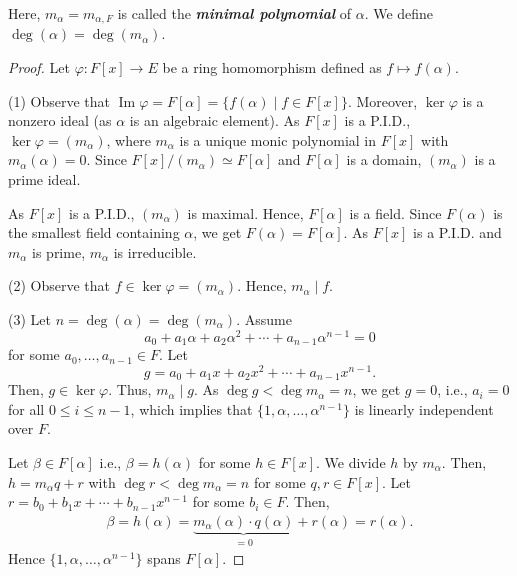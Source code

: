 \documentclass[twoside]{article}
\theoremstyle{remark}
\newcommand*\term[1]{\textbf{\textit{\mathversion{bold}#1}}}
\begin{document}
%
Here, \(m_\alpha = m_{\alpha,F}\) is called the \term{minimal polynomial} of \(\alpha\). We define \(\deg(\alpha) = \deg(m_\alpha)\).

\begin{proof}
  Let \(\varphi\colon F[x] \to E\) be a ring homomorphism defined as \(f \mapsto f(\alpha)\).
  
  \smallskip
  
  (1) Observe that \(\operatorname{Im}\varphi = F[\alpha] = \{f(\alpha) \mid f \in F[x]\}\). Moreover, \(\ker\varphi\) is a nonzero ideal (as \(\alpha\) is an algebraic element). As \(F[x]\) is a P.I.D., \(\ker\varphi = (m_\alpha)\), where \(m_\alpha\) is a unique monic polynomial in \(F[x]\) with \(m_\alpha(\alpha) = 0\). Since \(F[x]/(m_\alpha) \simeq F[\alpha]\) and \(F[\alpha]\) is a domain, \((m_\alpha)\) is a prime ideal.
  
  As \(F[x]\) is a P.I.D., \((m_\alpha)\) is maximal. Hence, \(F[\alpha]\) is a field. Since \(F(\alpha)\) is the smallest field containing \(\alpha\), we get \(F(\alpha) = F[\alpha]\). As \(F[x]\) is a P.I.D. and \(m_\alpha\) is prime, \(m_\alpha\) is irreducible.
  
  \smallskip
  
  (2) Observe that \(f \in \ker\varphi = (m_\alpha)\). Hence, \(m_\alpha \mid f\).
  
  \smallskip
  
  (3) Let \(n = \deg(\alpha) = \deg(m_\alpha)\). Assume
  \[ a_0 + a_1\alpha + a_2\alpha^2 + \cdots + a_{n-1}\alpha^{n-1} = 0 \]
  for some \(a_0, \dots, a_{n-1} \in F\). Let
  \[ g = a_0 + a_1 x + a_2 x^2 + \cdots + a_{n-1} x^{n-1}. \]
  Then, \(g \in \ker\varphi\). Thus, \(m_\alpha \mid g\). As \(\deg g < \deg m_\alpha = n\), we get \(g = 0\), i.e., \(a_i=0\) for all \(0 \leq i \leq n-1\), which implies that \(\{1, \alpha, \dots, \alpha^{n-1}\}\) is linearly independent over \(F\). \par
  Let \(\beta \in F[\alpha]\) i.e., \(\beta = h(\alpha)\) for some \(h \in F[x]\). We divide \(h\) by \(m_\alpha\). Then, \(h = m_\alpha q + r\) with \(\deg r < \deg m_\alpha = n\) for some \(q, r \in F[x]\). Let \(r = b_0 + b_1x + \cdots + b_{n-1}x^{n-1}\) for some \(b_i \in F\). Then,
  \begin{align*}
    \beta = h(\alpha) = \underbrace{m_\alpha(\alpha) \cdot q(\alpha)}_{=0} \mathop{+} r(\alpha) = r(\alpha).
  \end{align*}
  Hence \(\{1, \alpha, \dots, \alpha^{n-1}\}\) spans \(F[\alpha]\).
\end{proof}
\end{document}
